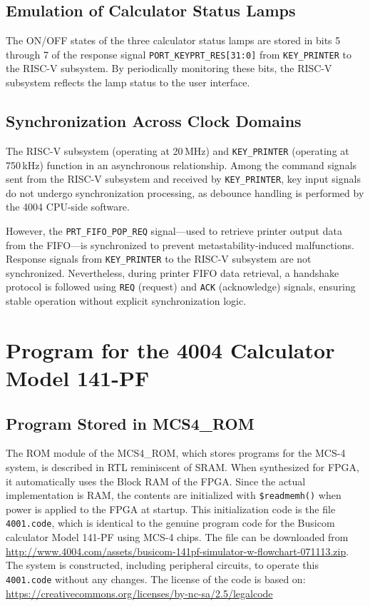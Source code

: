 \subsection{Emulation of Calculator Status Lamps}
The ON/OFF states of the three calculator status lamps are stored in bits 5 through 7 of the response signal \texttt{PORT\_KEYPRT\_RES[31:0]} from \texttt{KEY\_PRINTER} to the RISC-V subsystem. By periodically monitoring these bits, the RISC-V subsystem reflects the lamp status to the user interface.

\subsection{Synchronization Across Clock Domains}
The RISC-V subsystem (operating at 20\,MHz) and \texttt{KEY\_PRINTER} (operating at 750\,kHz) function in an asynchronous relationship. Among the command signals sent from the RISC-V subsystem and received by \texttt{KEY\_PRINTER}, key input signals do not undergo synchronization processing, as debounce handling is performed by the 4004 CPU-side software.

However, the \texttt{PRT\_FIFO\_POP\_REQ} signal—used to retrieve printer output data from the FIFO—is synchronized to prevent metastability-induced malfunctions. Response signals from \texttt{KEY\_PRINTER} to the RISC-V subsystem are not synchronized. Nevertheless, during printer FIFO data retrieval, a handshake protocol is followed using \texttt{REQ} (request) and \texttt{ACK} (acknowledge) signals, ensuring stable operation without explicit synchronization logic.

\section{Program for the 4004 Calculator Model 141-PF}
\subsection{Program Stored in MCS4\_ROM}
The ROM module of the MCS4\_ROM, which stores programs for the MCS-4 system, is described in RTL reminiscent of SRAM. When synthesized for FPGA, it automatically uses the Block RAM of the FPGA. Since the actual implementation is RAM, the contents are initialized with \verb|$readmemh()| when power is applied to the FPGA at startup. This initialization code is the file \texttt{4001.code}, which is identical to the genuine program code for the Busicom calculator Model 141-PF using MCS-4 chips. The file can be downloaded from \url{http://www.4004.com/assets/busicom-141pf-simulator-w-flowchart-071113.zip}. The system is constructed, including peripheral circuits, to operate this \texttt{4001.code} without any changes.
The license of the code is based on: \\
\url{https://creativecommons.org/licenses/by-nc-sa/2.5/legalcode}


